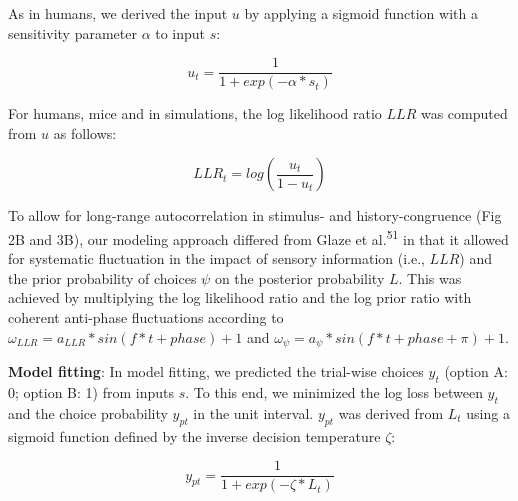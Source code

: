 \documentclass[
]{article}
\begin{document}
As in humans, we derived the input \(u\) by applying a sigmoid function
with a sensitivity parameter \(\alpha\) to input \(s\):

\begin{equation}
u_t = \frac{1}{1 + exp(-\alpha * s_t)}
\end{equation}

For humans, mice and in simulations, the log likelihood ratio \(LLR\)
was computed from \(u\) as follows:

\begin{equation}
LLR_t = log(\frac{u_t}{1-u_t})
\end{equation}

To allow for long-range autocorrelation in stimulus- and
history-congruence (Fig 2B and 3B), our modeling approach differed
from Glaze et al.\textsuperscript{51} in that it allowed for systematic
fluctuation in the impact of sensory information (i.e., \(LLR\)) and the
prior probability of choices \(\psi\) on the posterior probability
\(L\). This was achieved by multiplying the log likelihood ratio and the
log prior ratio with coherent anti-phase fluctuations according to
\(\omega_{LLR} = a_{LLR} * sin(f * t + phase) + 1\) and
\(\omega_{\psi} = a_{\psi} * sin(f * t + phase + \pi) + 1\).

\textbf{Model fitting}: In model fitting, we predicted the trial-wise
choices \(y_t\) (option A: 0; option B: 1) from inputs \(s\). To this
end, we minimized the log loss between \(y_t\) and the choice
probability \(y_{p t}\) in the unit interval. \(y_{p t}\) was derived
from \(L_t\) using a sigmoid function defined by the inverse decision
temperature \(\zeta\):

\begin{equation}
y_{p t} = \frac{1}{1 + exp(-\zeta * L_t)}
\end{equation}
\end{document}
